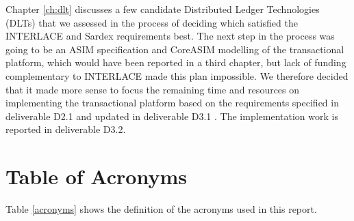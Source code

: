 Chapter \ref{ch:dlt} discusses a few candidate Distributed Ledger Technologies (DLTs) that we assessed in the process of deciding which satisfied the INTERLACE and Sardex requirements best. The next step in the process was going to be an ASIM specification and CoreASIM modelling of the transactional platform, which would have been reported in a third chapter, but lack of funding complementary to INTERLACE made this plan impossible. We therefore decided that it made more sense to focus the remaining time and resources on implementing the transactional platform based on the requirements specified in deliverable D2.1 \cite{INTERLACE_D21} and updated in deliverable D3.1 \cite{INTERLACE_D31}. The implementation work is reported in deliverable D3.2.



\section{Table of Acronyms}
Table \ref{acronyms} shows the definition of the acronyms used in this report.



